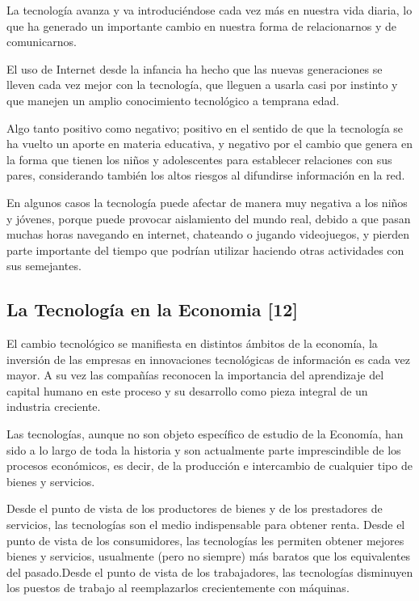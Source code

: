 \documentclass{bmcart}
\begin{document}
 La tecnología avanza y va introduciéndose cada vez más en nuestra vida diaria,  lo que ha generado un importante cambio en nuestra forma de relacionarnos y de comunicarnos.\smallskip
 
 El uso de Internet desde la infancia ha hecho que las nuevas generaciones se lleven cada vez mejor con la tecnología, que lleguen a usarla casi por instinto y que manejen un amplio conocimiento tecnológico a temprana edad.\smallskip
 
 Algo tanto positivo como negativo; positivo en el sentido de que la tecnología se ha vuelto un aporte en materia educativa, y negativo por el cambio que genera en la forma que tienen los niños y adolescentes para establecer relaciones con sus pares, considerando también los altos riesgos al difundirse información en la red.\smallskip

 En algunos casos la tecnología puede afectar de manera muy negativa a los niños y jóvenes, porque puede provocar aislamiento del mundo real, debido a que pasan muchas horas navegando en internet, chateando o jugando videojuegos, y pierden parte importante del tiempo que podrían utilizar haciendo otras actividades con sus semejantes.\smallskip
 
 \subsection*{La Tecnología en la Economia [12]}
 \smallskip
 
 El cambio tecnológico se manifiesta en distintos ámbitos de la economía, la inversión de las empresas en innovaciones tecnológicas de información es cada vez mayor. A su vez las compañías reconocen la importancia del aprendizaje del capital humano en este proceso y su desarrollo como pieza integral de un industria creciente.\smallskip
 
 Las tecnologías, aunque no son objeto específico de estudio de la Economía, han sido a lo largo de toda la historia y son actualmente parte imprescindible de los procesos económicos, es decir, de la producción e intercambio de cualquier tipo de bienes y servicios.\smallskip
 
 Desde el punto de vista de los productores de bienes y de los prestadores de servicios, las tecnologías son el medio indispensable para obtener renta. Desde el punto de vista de los consumidores, las tecnologías les permiten obtener mejores bienes y servicios, usualmente (pero no siempre) más baratos que los equivalentes del pasado.Desde el punto de vista de los trabajadores, las tecnologías disminuyen los puestos de trabajo al reemplazarlos crecientemente con máquinas.\smallskip
 
\end{document}
